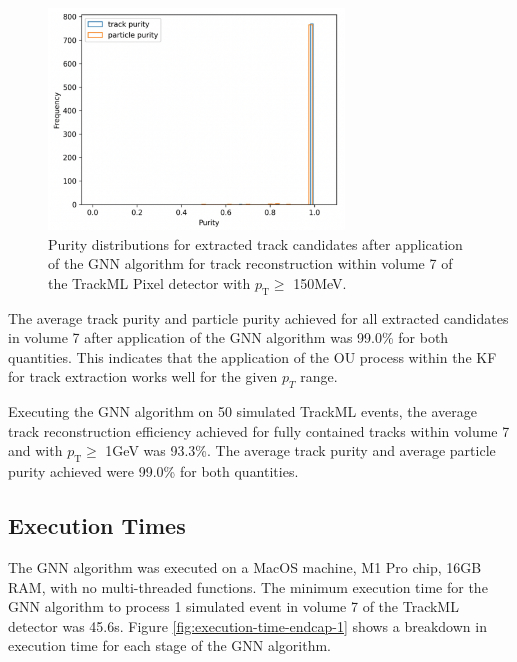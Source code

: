 \begin{figure}[htbp]
    \centering
    \includegraphics[width=0.7\textwidth]{images/7-results/endcap-purity.png}
    \caption{Purity distributions for extracted track candidates after application of the GNN algorithm for track reconstruction within volume 7 of the TrackML Pixel detector with $p_{\text{T}} \geq$ 150MeV.}
    \label{fig:trackml-results-endcap-purity}%
\end{figure}


The average track purity and particle purity achieved for all extracted candidates in volume 7 after application of the GNN algorithm was 99.0\% for both quantities. This indicates that the application of the OU process within the KF for track extraction works well for the given $p_{T}$ range.

Executing the GNN algorithm on 50 simulated TrackML events, the average track reconstruction efficiency achieved for fully contained tracks within volume 7 and with $p_{\text{T}} \geq$ 1GeV was 93.3\%. The average track purity and average particle purity achieved were 99.0\% for both quantities.








\subsection{Execution Times}

The GNN algorithm was executed on a MacOS machine, M1 Pro chip, 16GB RAM, with no multi-threaded functions. The minimum execution time for the GNN algorithm to process 1 simulated event in volume 7 of the TrackML detector was 45.6s. Figure \ref{fig:execution-time-endcap-1} shows a breakdown in execution time for each stage of the GNN algorithm.

